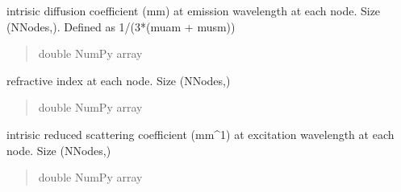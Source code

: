 \documentclass[letterpaper,10pt,english]{sphinxmanual}
\begin{document}
\begin{fulllineitems}
\begin{fulllineitems}
\begin{quote}
\begin{description}
\end{description}\end{quote}

\end{fulllineitems}


\begin{fulllineitems}
\label{\detokenize{_autosummary/nirfasterff.base.fluor_mesh.fluormesh:nirfasterff.base.fluor_mesh.fluormesh.kappam}}
\pysigstartsignatures
{}
\pysigstopsignatures
\sphinxAtStartPar
intrisic diffusion coefficient (mm) at emission wavelength at each node. Size (NNodes,). Defined as 1/(3*(muam + musm))
\begin{quote}\begin{description}
\sphinxAtStartPar
double NumPy array

\end{description}\end{quote}

\end{fulllineitems}


\begin{fulllineitems}
\label{\detokenize{_autosummary/nirfasterff.base.fluor_mesh.fluormesh:nirfasterff.base.fluor_mesh.fluormesh.ri}}
\pysigstartsignatures
{}
\pysigstopsignatures
\sphinxAtStartPar
refractive index at each node. Size (NNodes,)
\begin{quote}\begin{description}
\sphinxAtStartPar
double NumPy array

\end{description}\end{quote}

\end{fulllineitems}


\begin{fulllineitems}
\label{\detokenize{_autosummary/nirfasterff.base.fluor_mesh.fluormesh:nirfasterff.base.fluor_mesh.fluormesh.musx}}
\pysigstartsignatures
{}
\pysigstopsignatures
\sphinxAtStartPar
intrisic reduced scattering coefficient (mm\textasciicircum{}\sphinxhyphen{}1) at excitation wavelength at each node. Size (NNodes,)
\begin{quote}\begin{description}
\sphinxAtStartPar
double NumPy array


\end{description}
\end{quote}
\end{fulllineitems}
\end{fulllineitems}
\end{document}
